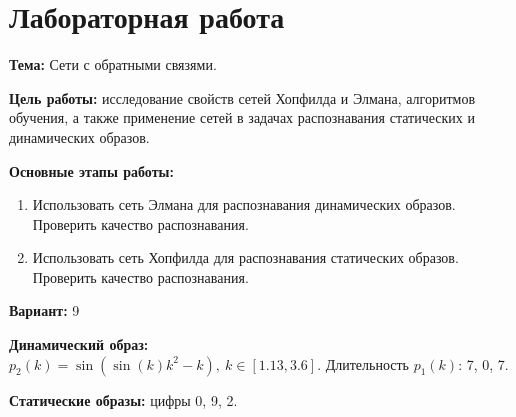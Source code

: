 \section*{Лабораторная работа }

{\bfseries Тема:} Сети с обратными связями.

{\bfseries Цель работы:} исследование свойств сетей Хопфилда и Элмана, алгоритмов обучения, а также применение сетей в задачах распознавания статических и динамических образов.

{\bfseries Основные этапы работы:}
\begin{enumerate}
	\item Использовать сеть Элмана для распознавания динамических образов. Проверить качество распознавания.
	\item Использовать сеть Хопфилда для распознавания статических образов. Проверить качество распознавания.
\end{enumerate}

{\bfseries Вариант:} 9

{\bfseries Динамический образ:} \\
$p_2(k) = \sin(\sin(k) k^2 - k),\ k \in [1.13, 3.6]$. Длительность $p_1(k)$: 7, 0, 7.

{\bfseries Статические образы:} цифры 0, 9, 2.

\pagebreak
